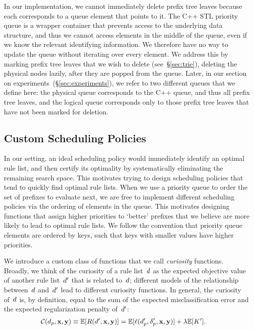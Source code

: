In our implementation, we cannot immediately delete prefix tree leaves
because each corresponds to a queue element that points to it.
%
The C++ STL priority queue is a wrapper container that prevents access to the
underlying data structure, and thus we cannot access elements in the middle of the queue,
even if we know the relevant identifying information.
%
We therefore have no way to update the queue without iterating over every element.
%
We address this by marking prefix tree leaves that we wish to delete (see~\S\ref{sec:trie}),
deleting the physical nodes lazily, after they are popped from the queue.
%
Later, in our section on experiments~(\S\ref{sec:experiments}),
we refer to two different queues that we define here: the physical queue
corresponds to the C++ queue, and thus all prefix tree leaves, and the logical queue
corresponds only to those prefix tree leaves that have not been marked for deletion.

\subsection{Custom Scheduling Policies}
\label{sec:scheduling}

In our setting, an ideal scheduling policy would immediately identify an optimal
rule list, and then certify its optimality by systematically eliminating the
remaining search space.
%
This motivates trying to design scheduling policies that tend to quickly find optimal rule lists.
%
When we use a priority queue to order the set of prefixes to evaluate next,
we are free to implement different scheduling policies via the ordering of
elements in the queue.
%
This motivates designing functions that assign higher priorities to `better'
prefixes that we believe are more likely to lead to optimal rule lists.
%
We follow the convention that priority queue elements are ordered
by keys, such that keys with smaller values have higher priorities.

We introduce a custom class of functions that we call \emph{curiosity} functions.
%
Broadly, we think of the curiosity of a rule list~${d}$
as the expected objective value of another rule list~${d}'$ that is related to~${d}$;
different models of the relationship between~${d}$ and~${d}'$ lead to different
curiosity functions.
%
In general, the curiosity of~${d}$ is, by definition, equal to the sum of the expected
misclassification error and the expected regularization penalty of~${d}'$:
\begin{align}
\mathcal{C}(d_p, \mathbf{x}, \mathbf{y}) \equiv \mathbb{E}[ R({d}', \mathbf{x}, \mathbf{y}) ]
&= \mathbb{E}[\ell(d_p', \delta_p', \mathbf{x}, \mathbf{y})] + {\lambda} \mathbb{E}[ K' ].
\label{eq:curiosity}
\end{align}

